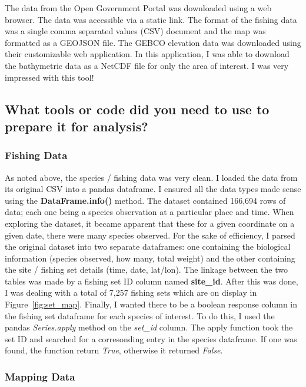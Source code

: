 The data from the Open Government Portal was downloaded using a web browser.
The data was accessible via a static link.
The format of the fishing data was a single comma separated values (CSV) document and the map was formatted as a GEOJSON file.
The GEBCO elevation data was downloaded using their customizable web application.
In this application, I was able to download the bathymetric data as a NetCDF file for only the area of interest.
I was very impressed with this tool!

\subsection{What tools or code did you need to use to prepare it for analysis?}

\subsubsection{Fishing Data}

As noted above, the species / fishing data was very clean.
I loaded the data from its original CSV into a pandas dataframe.
I ensured all the data types made sense using the \textbf{DataFrame.info()} method.
The dataset contained 166,694 rows of data; each one being a species observation at a particular place and time.
When exploring the dataset, it became apparent that these for a given coordinate on a given date, there were many species observed.
For the sake of efficiency, I parsed the original dataset into two separate dataframes:
one containing the biological information (species observed, how many, total weight)
and the other containing the site / fishing set details (time, date, lat/lon).
The linkage between the two tables was made by a fishing set ID column named \textbf{site\_id}.
After this was done, I was dealing with a total of 7,257 fishing sets which are on display in Figure~\ref{fig:set_map}.
Finally, I wanted there to be a boolean response column in the fishing set dataframe for each species of interest.
To do this, I used the pandas \textit{Series.apply} method on the \textit{set\_id} column.
The apply function took the set ID and searched for a corresonding entry in the species dataframe.
If one was found, the function return \textit{True}, otherwise it returned \textit{False}.

\subsubsection{Mapping Data}

